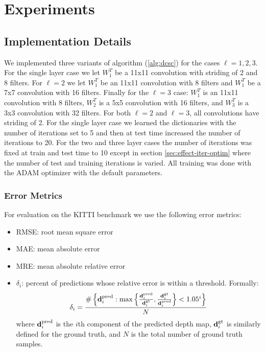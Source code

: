 \section{Experiments}

\subsection{Implementation Details}
\label{sec:impl-deta}

We implemented three variants of algorithm (\ref{alg:dcsc}) for the cases $\ell = 1,2,3$. For the single layer case we let $W^T_1$ be a 11x11 convolution with striding of 2 and 8 filters. For $\ell = 2$ we let $W^T_{1}$ be an 11x11 convolution with 8 filters and $W^T_{1}$ be a 7x7 convolution with 16 filters. Finally for the $\ell = 3$ case: $W^T_{1}$ is an 11x11 convolution with 8 filters, $W^T_{2}$ is a 5x5 convolution with 16 filters, and $W^T_{3}$ is a 3x3 convolution with 32 filters. For both $\ell = 2$ and $\ell = 3$, all convolutions have striding of 2. For the single layer case we learned the dictionaries with the number of iterations set to 5 and then at test time increased the number of iterations to 20. For the two and three layer cases the number of iterations was fixed at train and test time to 10 except in section \ref{sec:effect-iter-optim} where the number of test and training iterations is varied. All training was done with the ADAM optimizer with the default parameters.

\subsubsection{Error Metrics}
\label{sec:error-metrics}

For evaluation on the KITTI benchmark we use the following error metrics:
\begin{itemize}
\item RMSE: root mean square error
\item MAE: mean absolute error
\item MRE: mean absolute relative error
\item $\delta_i$: percent of predictions whose relative error is within a threshold. Formally:
  \begin{equation*}
    \delta_i = \frac{\#\left\{\mathbf{d}^\text{pred}_i : \max\left\{\frac{\mathbf{d}^\text{pred}_i}{\mathbf{d}^\text{gt}_i}, \frac{\mathbf{d}^\text{gt}_i}{\mathbf{d}^\text{pred}_i}\right\} < 1.05^i\right\}}{N}
  \end{equation*}
  where $\mathbf{d}^\text{pred}_i$ is the $i$th component of the predicted depth map, $\mathbf{d}^\text{gt}_i$ is similarly defined for the ground truth, and $N$ is the total number of ground truth samples.
\end{itemize}
